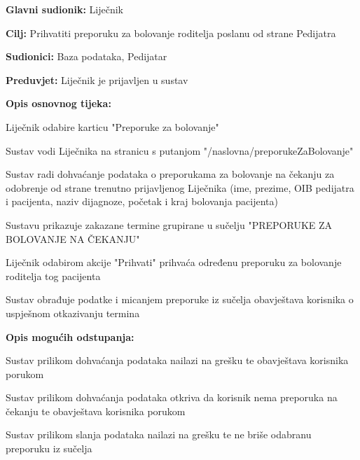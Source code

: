 					
					
					
				\noindent {}
					\begin{packed_item}
						
						\item \textbf{Glavni sudionik: }Liječnik
						\item  \textbf{Cilj:} Prihvatiti preporuku za bolovanje roditelja poslanu od strane Pedijatra
						\item  \textbf{Sudionici:} Baza podataka, Pedijatar
						\item  \textbf{Preduvjet:} Liječnik je prijavljen u sustav
						\item  \textbf{Opis osnovnog tijeka:}
						
						\item[] \begin{packed_enum}
							\item Liječnik odabire karticu "Preporuke za bolovanje"
							\item Sustav vodi Liječnika na stranicu s putanjom "/naslovna/preporukeZaBolovanje"
							\item Sustav radi dohvaćanje podataka o preporukama za bolovanje na čekanju za odobrenje od strane trenutno prijavljenog Liječnika (ime, prezime, OIB pedijatra i pacijenta, naziv dijagnoze, početak i kraj bolovanja pacijenta)
							\item Sustavu prikazuje zakazane termine grupirane u sučelju "PREPORUKE ZA BOLOVANJE NA ČEKANJU"
							\item Liječnik odabirom akcije "Prihvati" prihvaća određenu preporuku za bolovanje roditelja tog pacijenta
							\item Sustav obrađuje podatke i micanjem preporuke iz sučelja obavještava korisnika o uspješnom otkazivanju termina
						\end{packed_enum}
						
						\item  \textbf{Opis mogućih odstupanja:}
						
						\item[] \begin{packed_item}
							\item[3.a] Sustav prilikom dohvaćanja podataka nailazi na grešku te obavještava korisnika porukom
							
							\item[3.b] Sustav prilikom dohvaćanja podataka otkriva da korisnik nema preporuka na čekanju te obavještava korisnika porukom
							
							\item[6.a] Sustav prilikom slanja podataka nailazi na grešku te ne briše odabranu preporuku iz sučelja
						\end{packed_item}
					\end{packed_item}		
					
